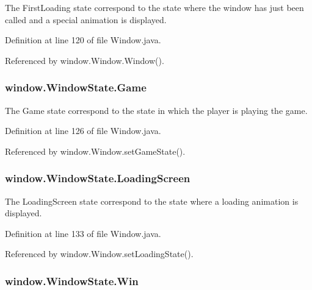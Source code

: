 The First\-Loading state correspond to the state where the window has just been called and a special animation is displayed. 



Definition at line 120 of file Window.\-java.



Referenced by window.\-Window.\-Window().

\hypertarget{enumwindow_1_1_window_state_abb4a2512f88d7104f91993174488282d}{
\subsubsection[{Game}]{\setlength{\rightskip}{0pt plus 5cm}window.\-Window\-State.\-Game}}\label{enumwindow_1_1_window_state_abb4a2512f88d7104f91993174488282d}


The Game state correspond to the state in which the player is playing the game. 



Definition at line 126 of file Window.\-java.



Referenced by window.\-Window.\-set\-Game\-State().

\hypertarget{enumwindow_1_1_window_state_a281f52964a4be64ea19bf2a401184521}{
\subsubsection[{Loading\-Screen}]{\setlength{\rightskip}{0pt plus 5cm}window.\-Window\-State.\-Loading\-Screen}}\label{enumwindow_1_1_window_state_a281f52964a4be64ea19bf2a401184521}


The Loading\-Screen state correspond to the state where a loading animation is displayed. 



Definition at line 133 of file Window.\-java.



Referenced by window.\-Window.\-set\-Loading\-State().

\hypertarget{enumwindow_1_1_window_state_adfd70a04c81f1ff3b289d5b766206fb5}{
\subsubsection[{Win}]{\setlength{\rightskip}{0pt plus 5cm}window.\-Window\-State.\-Win}}\label{enumwindow_1_1_window_state_adfd70a04c81f1ff3b289d5b766206fb5}


